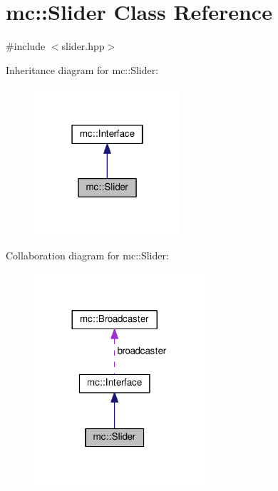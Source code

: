 \hypertarget{classmc_1_1Slider}{}\section{mc\+:\+:Slider Class Reference}
\label{classmc_1_1Slider}


{\ttfamily \#include $<$slider.\+hpp$>$}



Inheritance diagram for mc\+:\+:Slider\+:\nopagebreak
\begin{figure}[H]
\begin{center}
\leavevmode
\includegraphics[width=154pt]{classmc_1_1Slider__inherit__graph}
\end{center}
\end{figure}


Collaboration diagram for mc\+:\+:Slider\+:\nopagebreak
\begin{figure}[H]
\begin{center}
\leavevmode
\includegraphics[width=180pt]{classmc_1_1Slider__coll__graph}
\end{center}
\end{figure}
